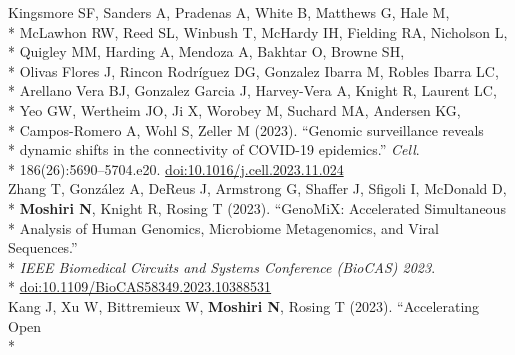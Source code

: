 \documentclass[margin,line]{res}
\begin{document}
\begin{resume}
\hspace*{9.5mm} Kingsmore SF, Sanders A, Pradenas A, White B, Matthews G, Hale M,\\*
\hspace*{9.5mm} McLawhon RW, Reed SL, Winbush T, McHardy IH, Fielding RA, Nicholson L,\\*
\hspace*{9.5mm} Quigley MM, Harding A, Mendoza A, Bakhtar O, Browne SH,\\*
\hspace*{9.5mm} Olivas Flores J, Rincon Rodríguez DG, Gonzalez Ibarra M, Robles Ibarra LC,\\*
\hspace*{9.5mm} Arellano Vera BJ, Gonzalez Garcia J, Harvey-Vera A, Knight R, Laurent LC,\\*
\hspace*{9.5mm} Yeo GW, Wertheim JO, Ji X, Worobey M, Suchard MA, Andersen KG,\\*
\hspace*{9.5mm} Campos-Romero A, Wohl S, Zeller M (2023). ``Genomic surveillance reveals\\*
\hspace*{9.5mm} dynamic shifts in the connectivity of COVID-19 epidemics.'' \textit{Cell}.\\*\vspace{2mm}
\hspace*{8mm} 186(26):5690--5704.e20. \href{https://doi.org/10.1016/j.cell.2023.11.024}{doi:10.1016/j.cell.2023.11.024}\\
\hspace*{4mm} Zhang T, Gonz\'alez A, DeReus J, Armstrong G, Shaffer J, Sfigoli I, McDonald D,\\*
\hspace*{9.5mm} \textbf{Moshiri N}, Knight R, Rosing T (2023). ``GenoMiX: Accelerated Simultaneous\\*
\hspace*{9.5mm} Analysis of Human Genomics, Microbiome Metagenomics, and Viral Sequences.''\\*
\hspace*{9.5mm} \textit{IEEE Biomedical Circuits and Systems Conference (BioCAS) 2023}.\\*\vspace{2mm}
\hspace*{7mm} \href{https://doi.org/10.1109/BioCAS58349.2023.10388531}{doi:10.1109/BioCAS58349.2023.10388531}\\
\hspace*{4mm} Kang J, Xu W, Bittremieux W, \textbf{Moshiri N}, Rosing T (2023). ``Accelerating Open\\*

\end{resume}
\end{document}
